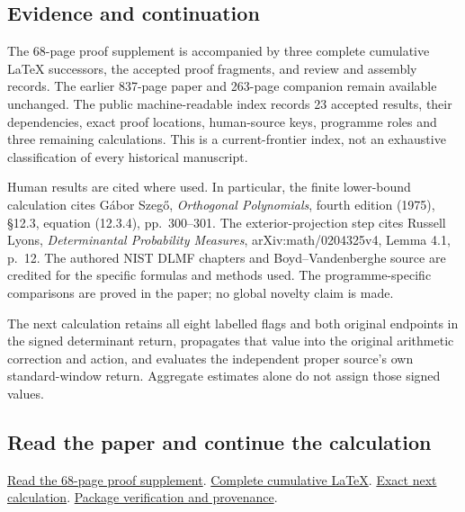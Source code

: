 \documentclass[
]{article}
\begin{document}
\subsection{Evidence and continuation}\label{evidence-and-continuation}

The 68-page proof supplement is accompanied by three complete cumulative
LaTeX successors, the accepted proof fragments, and review and assembly
records. The earlier 837-page paper and 263-page companion remain
available unchanged. The public machine-readable index records 23
accepted results, their dependencies, exact proof locations,
human-source keys, programme roles and three remaining calculations.
This is a current-frontier index, not an exhaustive classification of
every historical manuscript.

Human results are cited where used. In particular, the finite
lower-bound calculation cites Gábor Szegő, \emph{Orthogonal
Polynomials}, fourth edition (1975), §12.3, equation (12.3.4),
pp.~300--301. The exterior-projection step cites Russell Lyons,
\emph{Determinantal Probability Measures}, arXiv:math/0204325v4, Lemma
4.1, p.~12. The authored NIST DLMF chapters and Boyd--Vandenberghe
source are credited for the specific formulas and methods used. The
programme-specific comparisons are proved in the paper; no global
novelty claim is made.

The next calculation retains all eight labelled flags and both original
endpoints in the signed determinant return, propagates that value into
the original arithmetic correction and action, and evaluates the
independent proper source's own standard-window return. Aggregate
estimates alone do not assign those signed values.

\subsection{Read the paper and continue the
calculation}\label{read-the-paper-and-continue-the-calculation}

\href{https://github.com/KokunoYumeto/zeta-function-research-reader/blob/main/workbenches/splitzero-tandem/continuations/20260918-conductor-covariance-attained-profile/DUAL_WEB_PROOF_SUPPLEMENT.pdf}{Read
the 68-page proof supplement}.
\href{https://github.com/KokunoYumeto/zeta-function-research-reader/blob/main/workbenches/splitzero-tandem/continuations/20260918-conductor-covariance-attained-profile/cumulative/14_CURRENT_KERNEL_AND_MULTIPLICITY_PROOFS.tex}{Complete
cumulative LaTeX}.
\href{https://github.com/KokunoYumeto/zeta-function-research-reader/blob/main/workbenches/splitzero-tandem/continuations/20260918-conductor-covariance-attained-profile/NEXT_CALCULATION.md}{Exact
next calculation}.
\href{https://github.com/KokunoYumeto/zeta-function-research-reader/blob/main/workbenches/splitzero-tandem/continuations/20260918-conductor-covariance-attained-profile/SOURCE_PINS_AND_PUBLIC_DERIVATION.json}{Package
verification and provenance}.
\end{document}
